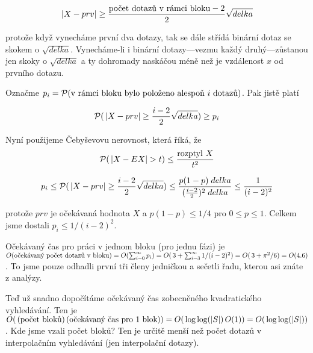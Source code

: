 $$|X-prv|\ge \frac{\hbox{počet dotazů v rámci bloku}-2}{2}\sqrt{delka}$$

protože když vynecháme první dva dotazy, tak se dále střídá binární dotaz
se skokem o $\sqrt{delka}$. Vynecháme-li i binární dotazy---vezmu každý
druhý---zůstanou jen skoky o $\sqrt{delka}$ a ty dohromady naskáčou méně
než je vzdálenost $x$ od prvního dotazu.

Označme $p_i=\pr(\hbox{v rámci bloku bylo položeno alespo\v n $i$ dotazů})$.
Pak jistě platí

$${\cal P}(\,|X-prv|\ge \frac{i-2}{2}\sqrt{delka})\ge p_i$$

Nyní použijeme Čebyševovu nerovnost, která říká, že
$$\pr(\,|X-EX|>t)\le \frac{\hbox{rozptyl }X}{t^2}$$

$$p_i \le {\cal P}(\,|X-prv|\ge \frac{i-2}{2}\sqrt{delka})\le \frac{p(1-p)\;delka}
{(\frac{i-2}{2})^2 \;delka} \le \frac{1}{(i-2)^2}$$

protože $prv$ je očekávaná hodnota $X$ a $p(1-p)\le 1/4$ pro
$0\le p\le 1$. Celkem jsme dostali $p_i\le 1/(i-2)^2$.


Očekávaný čas pro práci v jednom bloku (pro jednu fázi) je $O(\hbox{očekávaný
počet dotazů v bloku})=O(\sum_{i=0}^\infty p_i)=O(\,3+\sum_{i=3}^\infty
1/(i-2)^2)=O(\,3+\pi^2/6)=O(4.6)$. To jsme pouze odhadli první tři členy
jedničkou a sečetli řadu, kterou asi znáte z analýzy.

Teď už snadno dopočítáme očekávaný čas zobecněného kvadratického
vyhledávání. Ten je $O(\,\hbox{(počet bloků)}\,\hbox{(očekávaný čas pro 1
blok)})=O(\,\log\log(|S|)\, O(1))=O(\,\log\log(|S|))$. Kde jsme vzali
počet bloků? Ten je určitě menší než počet dotazů v interpolačním
vyhledávání (jen interpolační dotazy).
